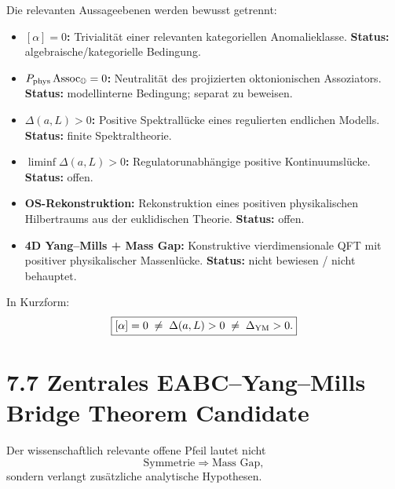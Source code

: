 \documentclass[11pt,a4paper]{article}
\begin{document}
Die relevanten Aussageebenen werden bewusst getrennt:

\begin{itemize}[leftmargin=1.6em]
\item \textbf{\([\alpha]=0\):}
Trivialität einer relevanten kategoriellen Anomalieklasse.
\textbf{Status:} algebraische/kategorielle Bedingung.

\item \textbf{\(P_{\rm phys}\operatorname{Assoc}_{\mathbb O}=0\):}
Neutralität des projizierten oktonionischen Assoziators.
\textbf{Status:} modellinterne Bedingung; separat zu beweisen.

\item \textbf{\(\Delta(a,L)>0\):}
Positive Spektrallücke eines regulierten endlichen Modells.
\textbf{Status:} finite Spektraltheorie.

\item \textbf{\(\liminf \Delta(a,L)>0\):}
Regulatorunabhängige positive Kontinuumslücke.
\textbf{Status:} offen.

\item \textbf{OS-Rekonstruktion:}
Rekonstruktion eines positiven physikalischen Hilbertraums aus der
euklidischen Theorie.
\textbf{Status:} offen.

\item \textbf{4D Yang--Mills + Mass Gap:}
Konstruktive vierdimensionale QFT mit positiver physikalischer Massenlücke.
\textbf{Status:} nicht bewiesen / nicht behauptet.
\end{itemize}

In Kurzform:
\[
\boxed{
[\alpha]=0
\;\neq\;
\Delta(a,L)>0
\;\neq\;
\Delta_{\rm YM}>0.
}
\]

\section*{7.7 Zentrales EABC--Yang--Mills Bridge Theorem Candidate}

Der wissenschaftlich relevante offene Pfeil lautet nicht
\[
\text{Symmetrie}\Longrightarrow\text{Mass Gap},
\]
sondern verlangt zusätzliche analytische Hypothesen.
\end{document}
